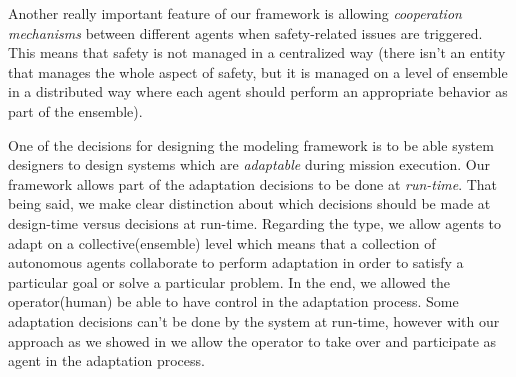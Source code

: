 \documentclass[journal]{IEEEtran}
\theoremstyle{definition}
\newcommand\darko[1]{\nb{Darko}{#1}}
\begin{document}
Another really important feature of our framework is allowing \textit{cooperation mechanisms} between different agents when safety-related issues are triggered. This means that safety is not managed in a centralized way (there isn't an  entity that manages the whole aspect of safety, but it is managed on a level of ensemble in a distributed way where each agent should perform an appropriate behavior as part of the ensemble).


One of the decisions for designing the modeling framework is to be able system designers to design systems which are \textit{adaptable} during mission execution. Our framework allows part of the adaptation decisions to be done at \textit{run-time}. That being said, we make clear distinction about which decisions should be made at design-time versus decisions at run-time. Regarding the type, we allow agents to adapt on a collective(ensemble) level which means that a collection of autonomous agents collaborate to perform adaptation in order to satisfy a particular goal or solve a particular problem. 
In the end, we allowed the operator(human) be able to have control in the adaptation process. Some adaptation decisions can't be done by the system at run-time, however with our approach as we showed in \cite{bozhinoski2016leveraging} we allow the operator to take over and participate as agent in the adaptation process. 





\darko{END}
\end{document}
